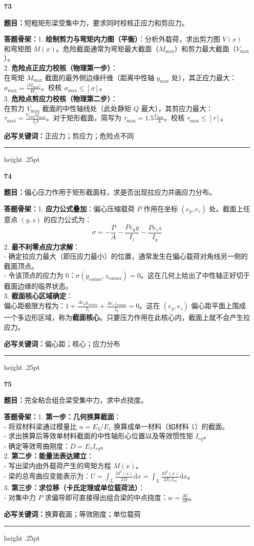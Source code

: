 \documentclass[a4paper,10pt]{article}
\newcommand{\qitem}[5]{%
\Needspace{6\baselineskip}
\vspace{3pt}
{\Large\bfseries\color{deep} #1}\quad{\bfseries\color{orangea}#2}\par
\textbf{题目：}#3\par
\textbf{答题骨架：}#4\par
\textbf{必写关键词：}{\color{bluea}#5}\par
\vspace{2pt}\hrule height .25pt
}
\begin{document}
\qitem{73}{梁弯曲 + 剪切}
{短粗矩形梁受集中力，要求同时校核正应力和剪应力。}
{1. \textbf{绘制剪力与弯矩内力图（平衡）}：分析外载荷，求出剪力图 \(V(x)\) 和弯矩图 \(M(x)\)。危险截面通常为弯矩最大截面（\(M_{\max}\)）和剪力最大截面（\(V_{\max}\)）。\\
2. \textbf{危险点正应力校核（物理第一步）}：\\
   在弯矩 \(M_{\max}\) 截面的最外侧边缘纤维（距离中性轴 \(y_{\max}\) 处），其正应力最大：\(\sigma_{\max} = \frac{|M_{\max}|}{W_z}\)。校核 \(\sigma_{\max} \le [\sigma]\)。\\
3. \textbf{危险点剪应力校核（物理第二步）}：\\
   在剪力 \(V_{\max}\) 截面的中性轴线处（此处静矩 \(Q\) 最大），其剪应力最大：\(\tau_{\max} = \frac{V_{\max} Q_{\max}}{I_z b}\)。对于矩形截面，简写为 \(\tau_{\max} = 1.5 \frac{V_{\max}}{A}\)。校核 \(\tau_{\max} \le [\tau]\)。}
{正应力；剪应力；危险点不同}

\qitem{74}{偏心压缩 + 核心}
{偏心压力作用于矩形截面柱，求是否出现拉应力并画应力分布。}
{1. \textbf{应力公式叠加}：偏心压缩载荷 \(P\) 作用在坐标 \((e_y, e_z)\) 处。截面上任意点 \((y, z)\) 的应力公式为：
   \[ \sigma = -\frac{P}{A} - \frac{P e_y y}{I_z} - \frac{P e_z z}{I_y} \]
2. \textbf{最不利零点应力求解}：\\
   - 确定拉应力最大（即压应力最小）的位置，通常发生在偏心载荷对角线另一侧的截面顶点。\\
   - 令该顶点的应力为 0：\(\sigma(y_{\text{corner}}, z_{\text{corner}}) = 0\)。这在几何上给出了中性轴正好切于截面边缘的临界状态。\\
3. \textbf{截面核心区域确定}：\\
   偏心距极限方程为：\(1 + \frac{A e_y y_{\text{corner}}}{I_z} + \frac{A e_z z_{\text{corner}}}{I_y} = 0\)。这在 \((e_y, e_z)\) 偏心距平面上围成一个多边形区域，称为\textbf{截面核心}。只要压力作用在此核心内，截面上就不会产生拉应力。}
{偏心距；核心；应力分布}

\qitem{75}{组合梁 + 能量法}
{完全粘合组合梁受集中力，求中点挠度。}
{1. \textbf{第一步：几何换算截面}：\\
   - 将双材料梁通过模量比 \(n = E_2 / E_1\) 换算成单一材料（如材料 1）的截面。\\
   - 求出换算后等效单材料截面的中性轴形心位置以及等效惯性矩 \(I_{eq}\)。\\
   - 确定等效弯曲刚度：\(D = E_1 I_{eq}\)。\\
2. \textbf{第二步：能量法表达建立}：\\
   - 写出梁内由外载荷产生的弯矩方程 \(M(x)\)。\\
   - 梁的总弯曲应变能表示为：\(U = \int_L \frac{M^2(x)}{2 D} \mathrm{d}x = \int_L \frac{M^2(x)}{2 E_1 I_{eq}} \mathrm{d}x\)。\\
3. \textbf{第三步：求位移（卡氏定理或单位载荷法）}：\\
   - 对集中力 \(P\) 求偏导即可直接得出组合梁的中点挠度：\(w = \frac{\partial U}{\partial P}\)。}
{换算截面；等效刚度；单位载荷}
\end{document}
